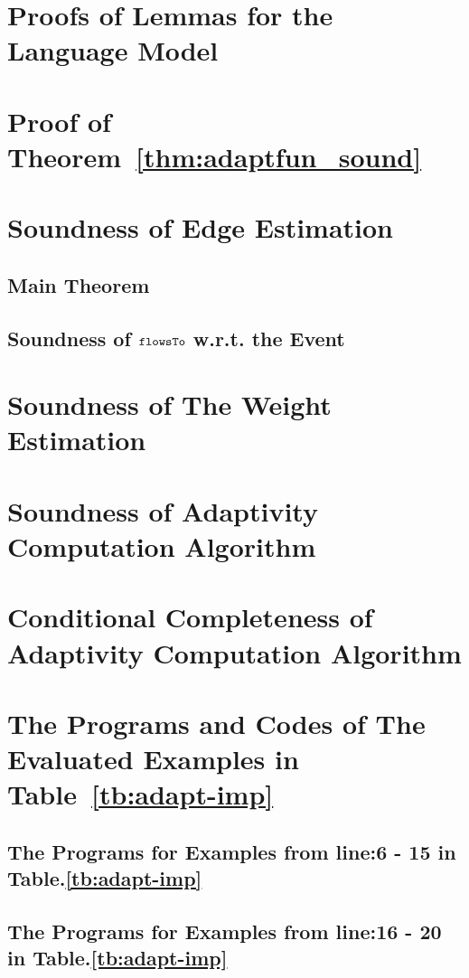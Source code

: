 \section{Proofs of Lemmas for the Language Model}
\label{apdx:lemma_sec123}

\section{Proof of Theorem~\ref{thm:adaptfun_sound}}
\label{apdx:adapt_soundness}

\clearpage
\section{Soundness of Edge Estimation}
\label{apdx:flowsto_soundness}
\subsection{Main Theorem}

%
\subsection{Soundness of $\mathtt{flowsTo}$ w.r.t. the Event}
\label{apdx:flowsto_event_soundness}

\clearpage
\section{Soundness of The Weight Estimation}
\label{apdx:reachability_soundness}

\clearpage
\section{Soundness of Adaptivity Computation Algorithm}
\label{apdx:adaptalg_soundness}

\section{Conditional Completeness of Adaptivity Computation Algorithm}
\label{apdx:adaptalg_completeness}


\section{The Programs and Codes of The Evaluated Examples in Table~\ref{tb:adapt-imp}}
\label{apdx:evaluated_examples}
\subsection{The Programs for Examples from line:6 - 15 in Table.\ref{tb:adapt-imp}}


\subsection{The Programs for Examples from line:16 - 20 in Table.\ref{tb:adapt-imp}}

